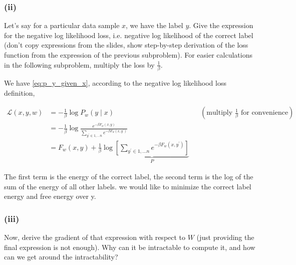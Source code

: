 \subsubsection*{(ii)}
Let's say for a particular data sample $x$, we have the label $y$. Give the expression for the negative log likelihood loss, i.e. negative log likelihood of the correct label (don't copy expressions from the slides, show step-by-step derivation of the loss function from the expression of the previous subproblem). For easier calculations in the following subproblem, multiply the loss by $\frac{1}{\beta}$.

We have \eqref{eq:p_y_given_x}, according to the negative log likelihood loss definition,

\begin{align}
    \mathcal{L}(x, y, w)
     & = -\frac{1}{\beta} \log P_{w}(y \mid x)                                                                                          &  & (\text{multiply $\frac{1}{\beta}$ for convenience}) \\
     & = -\frac{1}{\beta} \log \frac{e^{-\beta F_{w}(x, y)}}{\sum_{y^{\prime} \in {1,...n}} e^{-\beta F_{w}\left(x, y^{\prime}\right)}}                                                          \\
     & = F_{w}(x, y) +
    \frac{1}{\beta} \log
    \underbrace{
        \left[
            \sum_{y^{\prime} \in {1,...n}} e^{-\beta F_{w}\left(x, y^{\prime}\right)}
            \right]}_{P}
    \label{eq:loss}
\end{align}

The first term is the energy of the correct label, the second term is the log of the sum of the energy of all other labels. we would like to minimize the correct label energy and free energy over y.


\subsubsection*{(iii)}
Now, derive the gradient of that expression with respect to $W$ (just providing the final expression is not enough). Why can it be intractable to compute it, and how can we get around the intractability?


